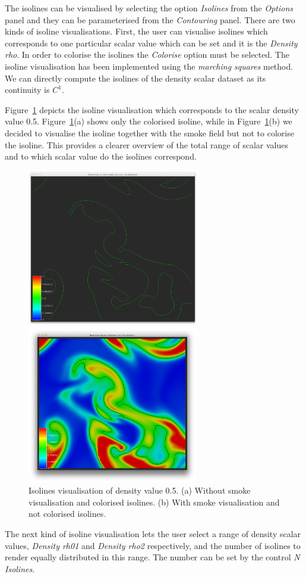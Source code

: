 
The isolines can be visualised by selecting the option \emph{Isolines} from the \emph{Options} panel and they can be parameterised from the \emph{Contouring} panel. There are two kinds of isoline visualisations. First, the user can visualise isolines which corresponds to one particular scalar value which can be set and it is the \emph{Density rho}. In order to colorise the isolines the \emph{Colorise} option must be selected. The isoline visualisation has been implemented using the \emph{marching squares} method. We can directly compute the isolines of the density scalar dataset as its continuity is $C^1$.

Figure~\ref{fig:isolineOneValue} depicts the isoline visualisation which corresponds to the scalar density value 0.5. Figure~\ref{fig:isolineOneValue}(a) shows only the colorised isoline, while in Figure~\ref{fig:isolineOneValue}(b) we decided to visualise the isoline together with the smoke field but not to colorise the isoline. This provides a clearer overview of the total range of scalar values and to which scalar value do the isolines correspond.

\begin{figure}[htbp]
\begin{center}
\begin{minipage}[t]{0.48\textwidth}
\includegraphics[height=2.7in]{figures/isolines/isoline.png}
\end{minipage}
\begin{minipage}[t]{0.48\textwidth}
\includegraphics[height=2.7in]{figures/isolines/isolineSmoke.png}
\end{minipage}
\caption{Isolines visualisation of density value 0.5. (a) Without smoke visualisation and colorised isolines. (b) With smoke visualisation and not colorised isolines.}
\label{fig:isolineOneValue}
\end{center}
\end{figure}

The next kind of isoline visualisation lets the user select a range of density scalar values, \emph{Density rh01} and \emph{Density rho2} respectively, and the number of isolines to render equally distributed in this range. The number can be set by the control \emph{N Isolines}.